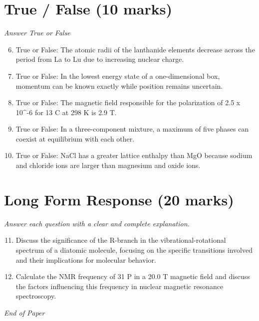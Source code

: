 \documentclass[12pt]{article}
\begin{document}
\section*{True / False (10 marks)}
\textit{Answer True or False}
\begin{enumerate}[label=\arabic*.]
\setcounter{enumi}{5}
\item True or False: The atomic radii of the lanthanide elements decrease across the period from La to Lu due to increasing nuclear charge.
\item True or False: In the lowest energy state of a one-dimensional box, momentum can be known exactly while position remains uncertain.
\item True or False: The magnetic field responsible for the polarization of 2.5 x 10^-6 for 13 C at 298 K is 2.9 T.
\item True or False: In a three-component mixture, a maximum of five phases can coexist at equilibrium with each other.
\item True or False: NaCl has a greater lattice enthalpy than MgO because sodium and chloride ions are larger than magnesium and oxide ions.
\end{enumerate}

\section*{Long Form Response (20 marks)}
\textit{Answer each question with a clear and complete explanation.}
\begin{enumerate}[label=\arabic*.]
\setcounter{enumi}{10}
\item Discuss the significance of the R-branch in the vibrational-rotational spectrum of a diatomic molecule, focusing on the specific transitions involved and their implications for molecular behavior.
\item Calculate the NMR frequency of 31 P in a 20.0 T magnetic field and discuss the factors influencing this frequency in nuclear magnetic resonance spectroscopy.
\end{enumerate}

\vfill
\noindent\textit{End of Paper}
\end{document}
